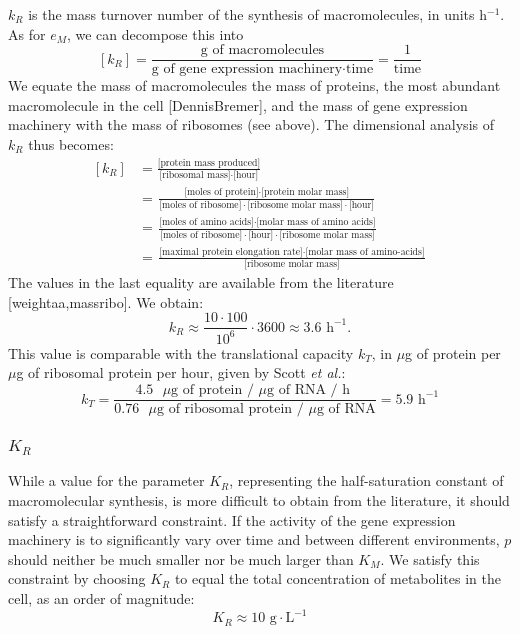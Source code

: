 $k_R$ is the mass turnover number of the synthesis of macromolecules, in units h$^{-1}$.
As for $e_M$, we can decompose this into
\[
[k_R]  = \frac{\text{g of macromolecules}}{\text{g of gene expression machinery}\cdot \text{time}} = \frac{1}{\text{time}}
\]
We equate the mass of macromolecules the mass of proteins, the most abundant macromolecule in the cell [DennisBremer], and the mass of gene expression machinery with the mass of ribosomes (see above).
The dimensional analysis of $k_R$ thus becomes:
\[
\begin{aligned}
\left[k_R\right] &= \frac{\text{[protein mass produced]}}{\text{[ribosomal mass]} \cdot \text{[hour]}}\\
&= \frac{\text{[moles of protein]} \cdot \text{[protein molar mass]}}{\text{[moles of ribosome]} \cdot \text{[ribosome molar mass]} \cdot \text{[hour]}}\\
&= \frac{\text{[moles of amino acids]} \cdot \text{[molar mass of amino acids]}}{\text{[moles of ribosome]} \cdot \text{[hour]} \cdot \text{[ribosome molar mass]}}\\
&= \frac{\text{[maximal protein elongation rate]} \cdot \text{[molar mass of amino-acids]}}{\text{[ribosome molar mass]}}
\end{aligned}
\]
The values in the last equality are available from the literature\cite{ehrenberg_mediumdependent_2012,klumpp_molecular_2013} [weightaa,massribo].
We obtain:
\[
k_R \approx \frac{10 \cdot 100}{10^6}\cdot 3600 \approx 3.6 \text{ h}^{-1}.
\]
This value is comparable with the translational capacity $k_T$, in $\mu$g of protein per $\mu$g of ribosomal protein per hour, given by Scott \textit{et al.}\cite{scott_interdependence_2010}:
\[
k_T = \frac{4.5 \text{ }\mu\text{g of protein} \text{ / }\mu\text{g of RNA} \text{ / h }}{0.76 \text{ }\mu\text{g of ribosomal protein} \text{ / } \mu\text{g of RNA}} = 5.9 \text{ h}^{-1}
\]

\subsubsection{\texorpdfstring{$K_R$}{KR}}

While a value for the parameter $K_R$, representing the half-saturation constant of macromolecular synthesis, is more difficult to obtain from the literature, it should satisfy a straightforward constraint.
If the activity of the gene expression machinery is to significantly vary over time and between different environments, $p$ should neither be much smaller nor be much larger than $K_M$.
We satisfy this constraint by choosing $K_R$ to equal the total concentration of metabolites in the cell, as an order of magnitude\cite{bennett_absolute_2009}:
\[
K_R \approx 10\text{ g} \cdot \text{L}^{-1}
\]

